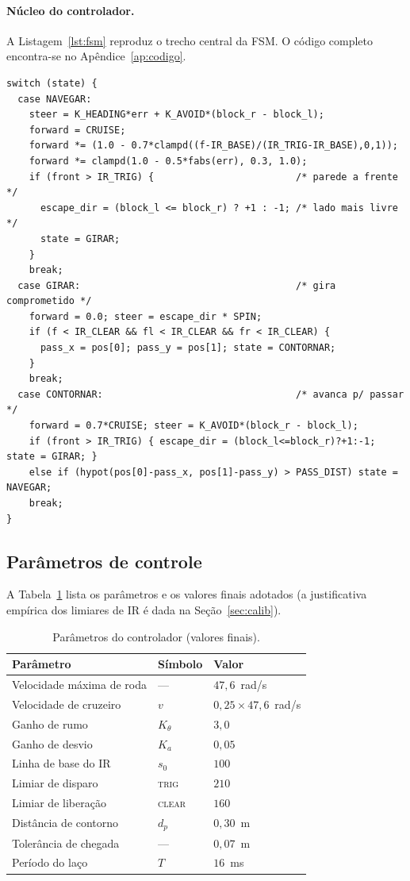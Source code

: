 \documentclass[11pt,a4paper]{article}
\begin{document}
\paragraph{Núcleo do controlador.}
A Listagem~\ref{lst:fsm} reproduz o trecho central da FSM. O código completo encontra-se no Apêndice~\ref{ap:codigo}.

\begin{lstlisting}[style=c,caption={Núcleo da máquina de estados (excerto).},label={lst:fsm}]
switch (state) {
  case NAVEGAR:
    steer = K_HEADING*err + K_AVOID*(block_r - block_l);
    forward = CRUISE;
    forward *= (1.0 - 0.7*clampd((f-IR_BASE)/(IR_TRIG-IR_BASE),0,1));
    forward *= clampd(1.0 - 0.5*fabs(err), 0.3, 1.0);
    if (front > IR_TRIG) {                         /* parede a frente */
      escape_dir = (block_l <= block_r) ? +1 : -1; /* lado mais livre */
      state = GIRAR;
    }
    break;
  case GIRAR:                                      /* gira comprometido */
    forward = 0.0; steer = escape_dir * SPIN;
    if (f < IR_CLEAR && fl < IR_CLEAR && fr < IR_CLEAR) {
      pass_x = pos[0]; pass_y = pos[1]; state = CONTORNAR;
    }
    break;
  case CONTORNAR:                                  /* avanca p/ passar */
    forward = 0.7*CRUISE; steer = K_AVOID*(block_r - block_l);
    if (front > IR_TRIG) { escape_dir = (block_l<=block_r)?+1:-1; state = GIRAR; }
    else if (hypot(pos[0]-pass_x, pos[1]-pass_y) > PASS_DIST) state = NAVEGAR;
    break;
}
\end{lstlisting}

\subsection{Parâmetros de controle}
A Tabela~\ref{tab:param} lista os parâmetros e os valores finais adotados (a justificativa empírica dos limiares de IR é dada na Seção~\ref{sec:calib}).

\begin{table}[H]
\centering
\caption{Parâmetros do controlador (valores finais).}
\label{tab:param}
\begin{tabular}{@{}lll@{}}
\toprule
\textbf{Parâmetro} & \textbf{Símbolo} & \textbf{Valor} \\
\midrule
Velocidade máxima de roda & --- & $47{,}6$~rad/s \\
Velocidade de cruzeiro & $v$ & $0{,}25\times47{,}6$~rad/s \\
Ganho de rumo & $K_\theta$ & $3{,}0$ \\
Ganho de desvio & $K_a$ & $0{,}05$ \\
Linha de base do IR & $s_0$ & $100$ \\
Limiar de disparo & \textsc{trig} & $210$ \\
Limiar de liberação & \textsc{clear} & $160$ \\
Distância de contorno & $d_p$ & $0{,}30$~m \\
Tolerância de chegada & --- & $0{,}07$~m \\
Período do laço & $T$ & $16$~ms \\
\bottomrule
\end{tabular}
\end{table}
\end{document}
